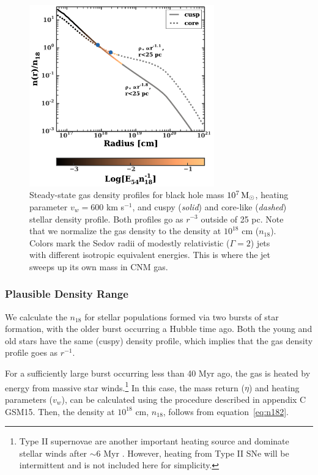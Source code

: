 \documentclass[usenatbib,fleqn]{mnras}
\newcommand{\Msun}{{\rm M_\odot}}
\begin{document}
\begin{figure}
\includegraphics[width=8cm]{sedov_radius.pdf}
\caption{\label{fig:profiles} Steady-state gas density profiles for
  black hole mass $10^{7} \,\Msun$, heating parameter $v_w=600$ km
  s$^{-1}$, and cuspy ({\it solid}) and core-like ({\it dashed})
  stellar density profile. Both profiles go as $r^{-3}$ outside of 25
  pc. Note that we normalize the gas density to the density at
  $10^{18}$ cm ($n_{18}$). Colors mark the Sedov radii of modestly
  relativistic ($\Gamma=2$) jets with different isotropic equivalent
  energies. This is where the jet sweeps up its own mass in CNM gas.}
\end{figure}



\subsubsection{Plausible Density Range}
\label{sec:densAllowed}

We calculate the $n_{18}$ for stellar populations
formed via two bursts of star formation, with the older burst
occurring a Hubble time ago.  Both the young and old stars have the
same (cuspy) density profile, which implies that the gas density
profile goes as $r^{-1}$.

For a sufficiently large burst occurring less than 40 Myr ago, the gas
is heated by energy from massive star winds.\footnote{Type II
  supernovae are another important heating source and dominate stellar
  winds after $\sim$6 Myr \citep{Voss+2009}. However, heating from
  Type II SNe will be intermittent and is not included here for
  simplicity.}  In this case, the mass return ($\eta$) and heating
parameters ($v_w$), can be calculated using the procedure described in
appendix C GSM15. Then, the density at $10^{18}$ cm, $n_{18}$, follows
from equation~\eqref{eq:n182}.
\end{document}
